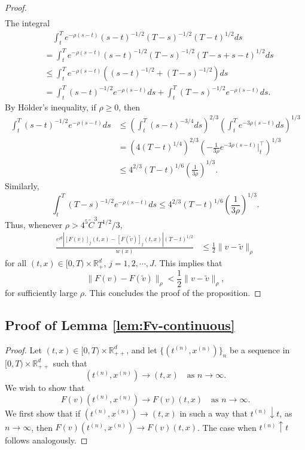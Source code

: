 \documentclass[11pt]{article}
\theoremstyle{definition}
\theoremstyle{plain}
\begin{document}
\begin{appendices}
\begin{proof}
\begin{align*}
\end{align*}
The integral
\begin{align*}
&\quad \int_t^T e^{-\rho(s - t)} (s - t)^{-1/2} (T - s)^{-1/2} (T - t)^{1/2} ds \\
&=  \int_t^T e^{-\rho(s - t)} (s - t)^{-1/2} (T - s)^{-1/2} (T - s + s - t)^{1/2} ds \\
&\leq \int_t^T e^{-\rho(s - t)} \left( (s - t)^{-1/2} + (T - s)^{-1/2} \right) ds \\
&= \int_t^T (s - t)^{-1/2} e^{-\rho(s - t)} ds + \int_t^T (T - s)^{-1/2} e^{-\rho(s - t)} ds.
\end{align*}
By Hölder’s inequality, if \( \rho \geq 0 \), then
\begin{align*}
\int_t^T (s - t)^{-1/2} e^{-\rho(s - t)} ds 
&\leq \left( \int_t^T (s - t)^{-3/4} ds \right)^{2/3} 
\left( \int_t^T e^{-3\rho(s - t)} ds \right)^{1/3} \\
&= \left( 4(T - t)^{1/4} \right)^{2/3} 
\left( -\frac{1}{3\rho} e^{-3\rho(s - t)} \Big|_t^{\top} \right)^{1/3} \\
&\leq 4^{2/3} (T - t)^{1/6} \left( \frac{1}{3\rho} \right)^{1/3}.
\end{align*}
Similarly, 
\[
\int_t^T (T - s)^{-1/2} e^{-\rho(s - t)} ds \leq 4^{2/3} (T - t)^{1/6} \left( \frac{1}{3\rho} \right)^{1/3}.
\]
Thus, whenever \( \rho >  4^5 \tilde C^3 T^{1/2}/3\),  
\begin{align*}
\frac{e^{\rho t} \left|\left[F(v)\right]_j(t,x) - \left[F(\tilde{v})\right]_j(t,x)\right|(T - t)^{1/2}}{w(x)} 
&\leq \frac{1}{2} \| v - \tilde{v} \|_\rho
\end{align*}
for all \( (t,x) \in [0,T) \times \mathbb{R}_+^d \), $j = 1,2, \cdots, J$. This implies that
\[
\|F(v) - F(\tilde{v})\|_\rho < \frac{1}{2} \| v - \tilde{v} \|_\rho,
\]
for sufficiently large \( \rho \).  
This concludes the proof of the proposition. 
\end{proof}

\subsection{Proof of Lemma \ref{lem:Fv-continuous}}
\begin{proof} Let \( (t,x) \in [0,T) \times \mathbb{R}_{++}^d \), and let \( \{(t^{(n)}, x^{(n)})\}_n \)  
be a sequence in \( [0,T) \times \mathbb{R}_{++}^d \) such that  
\[
(t^{(n)}, x^{(n)}) \to (t,x) \quad \text{as } n \to \infty.
\]
We wish to show that 
\[
F(v)(t^{(n)}, x^{(n)}) \to F(v)(t,x) \quad \text{as } n \to \infty.
\]
We first show that if $(t^{(n)}, x^{(n)}) \to (t,x)$ in such a way that $t^{(n)} \downarrow t$, as $n \to \infty$, then 
$F(v)(t^{(n)}, x^{(n)}) \to F(v)(t,x)$. The case when $t^{(n)} \uparrow t$ follows analogously. 


\end{proof}
\end{appendices}
\end{document}
